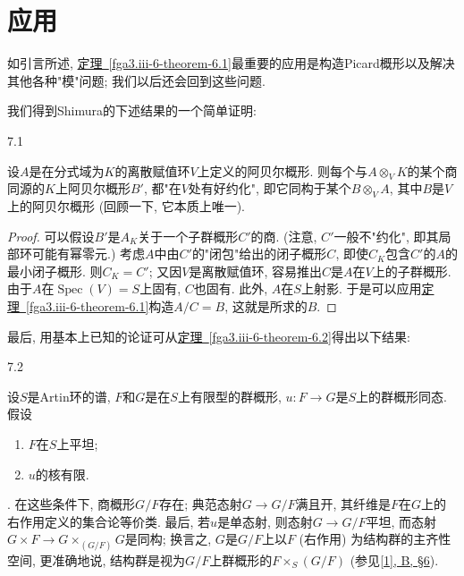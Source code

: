 \chapter{应用}\thispagestyle{fancy}\label{fga3.iii-7}
\par{}如引言所述, \hyperref[fga3.iii-6-theorem-6.1]{定理~\ref*{fga3.iii-6-theorem-6.1}}最重要的应用是构造Picard概形以及解决其他各种"模"问题; 我们以后还会回到这些问题.
\par{}我们得到Shimura的下述结果的一个简单证明:
\begin{proposition}{7.1}\label{fga3.iii-7-proposition-7.1}\skipsinglepar
\par{}设\(A\)是在分式域为\(K\)的离散赋值环\(V\)上定义的阿贝尔概形. 则每个与\(A\otimes _V K\)的某个商同源的\(K\)上阿贝尔概形\(B'\), 都"在\(V\)处有好约化", 即它同构于某个\(B\otimes _V A\), 其中\(B\)是\(V\)上的阿贝尔概形 (回顾一下, 它本质上唯一).
\begin{proof}
\par{}可以假设\(B'\)是\(A_K\)关于一个子群概形\(C'\)的商. (注意, \(C'\)一般不"约化", 即其局部环可能有幂零元.) 考虑\(A\)中由\(C'\)的"闭包"给出的闭子概形\(C\), 即使\(C_K\)包含\(C'\)的\(A\)的最小闭子概形. 则\(C_K=C'\); 又因\(V\)是离散赋值环, 容易推出\(C\)是\(A\)在\(V\)上的子群概形. 由于\(A\)在\(\operatorname {Spec}(V)=S\)上固有, \(C\)也固有. 此外, \(A\)在\(S\)上射影. 于是可以应用\hyperref[fga3.iii-6-theorem-6.1]{定理~\ref*{fga3.iii-6-theorem-6.1}}构造\(A/C=B\), 这就是所求的\(B\).
\end{proof}
\end{proposition}
\par{}最后, 用基本上已知的论证可从\hyperref[fga3.iii-6-theorem-6.2]{定理~\ref*{fga3.iii-6-theorem-6.2}}得出以下结果:
\begin{theorem}{7.2}\label{fga3.iii-7-theorem-7.2}\skipsinglepar
\par{}设\(S\)是Artin环的谱, \(F\)和\(G\)是在\(S\)上有限型的群概形, \(u\colon  F\to  G\)是\(S\)上的群概形同态. 假设
\begin{enumerate}
      
 \item[i.]\(F\)在\(S\)上平坦;

      
 \item[ii.]\(u\)的核有限.

    
\end{enumerate}. 在这些条件下, 商概形\(G/F\)存在; 典范态射\(G\to  G/F\)满且开, 其纤维是\(F\)在\(G\)上的右作用定义的集合论等价类. 最后, 若\(u\)是单态射, 则态射\(G\to  G/F\)平坦, 而态射\(G\times  F\to  G\times _{(G/F)}G\)是同构; 换言之, \(G\)是\(G/F\)上以\(F\) (右作用) 为结构群的主齐性空间, 更准确地说, 结构群是视为\(G/F\)上群概形的\(F\times _S(G/F)\) (参见\hyperref[fga3.i-b.6]{[1], B, §6}).
\end{theorem}
